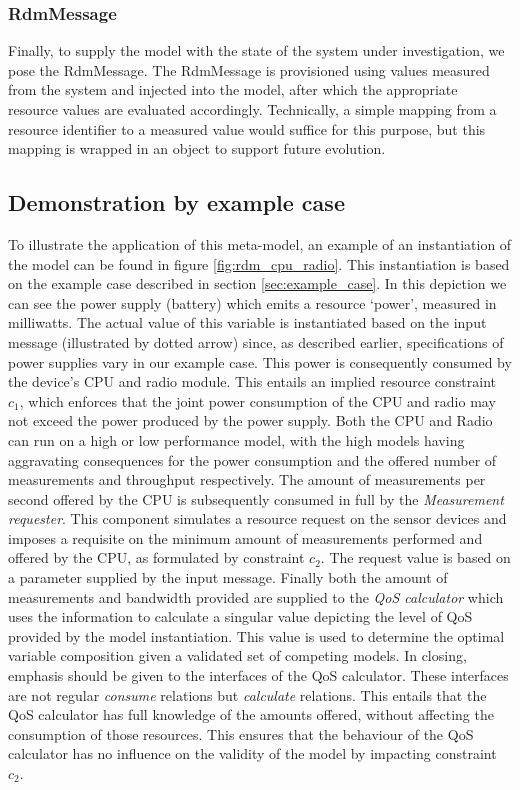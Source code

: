 \subsubsection{RdmMessage}
Finally, to supply the model with the state of the system under investigation, we pose the RdmMessage. The RdmMessage is provisioned using values measured from the system and injected into the model, after which the appropriate resource values are evaluated accordingly. Technically, a simple mapping from a resource identifier to a measured value would suffice for this purpose, but this mapping is wrapped in an object to support future evolution.


\subsection{Demonstration by example case}
To illustrate the application of this meta-model, an example of an instantiation of the model can be found in figure \ref{fig:rdm_cpu_radio}. This instantiation is based on the example case described in section \ref{sec:example_case}. In this depiction we can see the power supply (battery) which emits a resource `power', measured in milliwatts. The actual value of this variable is instantiated based on the input message (illustrated by dotted arrow) since, as described earlier, specifications of power supplies vary in our example case. This power is consequently consumed by the device's CPU and radio module. This entails an implied resource constraint $c_1$, which enforces that the joint power consumption of the CPU and radio may not exceed the power produced by the power supply. Both the CPU and Radio can run on a high or low performance model, with the high models having aggravating consequences for the power consumption and the offered number of measurements and throughput respectively. The amount of measurements per second offered by the CPU is subsequently consumed in full by the \emph{Measurement requester}. This component simulates a resource request on the sensor devices and imposes a requisite on the minimum amount of measurements performed and offered by the CPU, as formulated by constraint $c_2$. The request value is based on a parameter supplied by the input message. Finally both the amount of measurements and bandwidth provided are supplied to the \emph{QoS calculator} which uses the information to calculate a singular value depicting the level of QoS provided by the model instantiation. This value is used to determine the optimal variable composition given a validated set of competing models. In closing, emphasis should be given to the interfaces of the QoS calculator. These interfaces are not regular \emph{consume} relations but \emph{calculate} relations. This entails that the QoS calculator has full knowledge of the amounts offered, without affecting the consumption of those resources. This ensures that the behaviour of the QoS calculator has no influence on the validity of the model by impacting constraint $c_2$.

